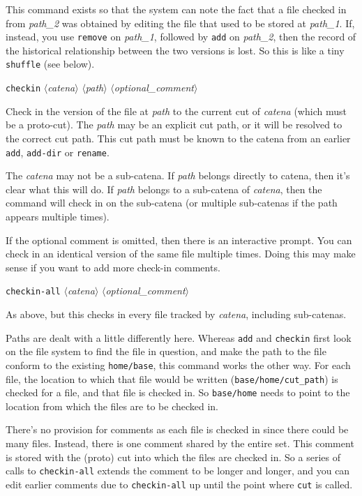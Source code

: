 \documentclass[10pt]{article}
\newcommand{\itarg}[1]{\textit{$\langle$#1$\rangle$}}
\begin{document}
{\begin{hang}
This command exists so that the system can note the fact that a file 
checked in from {\it path\_2} was obtained by editing the file that used to be
stored at {\it path\_1}. If, instead, you use {\tt remove} on {\it
  path\_1}, followed by {\tt add} on {\it path\_2}, then the record of the
historical relationship between the two versions is lost. So this is
like a tiny {\tt shuffle} (see below).
\end{hang}

{\tt checkin} \itarg{catena} \itarg{path} \itarg{optional\_comment}
\begin{hang}
Check in the version of the file at {\it path} to the current
cut of {\it catena} (which must be a proto-cut). The {\it path} may be
an explicit cut path, or it will be resolved to the correct cut
path. This cut path must be known to the catena from an earlier 
{\tt add}, {\tt add-dir} or {\tt rename}.  

The {\it catena} may not be a sub-catena. If {\it path} belongs
directly to catena, then it's clear what this will do. If {\it path}
belongs to a sub-catena of {\it catena}, then the command will 
check in on the sub-catena (or multiple sub-catenas if the path
appears multiple times).
  
If the optional comment is omitted, then there is an interactive
prompt. You can check in an identical version of the same file multiple times.
Doing this may make sense if you want to add more check-in
comments.
\end{hang}
  
{\tt checkin-all} \itarg{catena} \itarg{optional\_comment}
\begin{hang}
As above, but this checks in every file tracked by {\it catena},
including sub-catenas.
  
Paths are dealt with a little differently here. Whereas {\tt add} and
{\tt checkin} first look on the file system to find the file in
question, and make the path to the file conform to the existing 
{\tt home/base}, this command works the other way. For each file, the 
location to which that file would be written ({\tt base/home/cut\_path})
is checked for a file, and that file is checked in. So {\tt base/home}
needs to point to the location from which the files are to be checked in.  
  
There's no provision for comments as each file is checked in since
there could be many files.
Instead, there is one comment shared by the
entire set. This comment is stored with the (proto) cut into which the
files are checked in. So a series of calls to {\tt checkin-all}
extends the comment to be longer and longer, and you can edit earlier
comments due to {\tt checkin-all} up until the point where {\tt cut} is called.
\end{hang}

}
\end{document}
